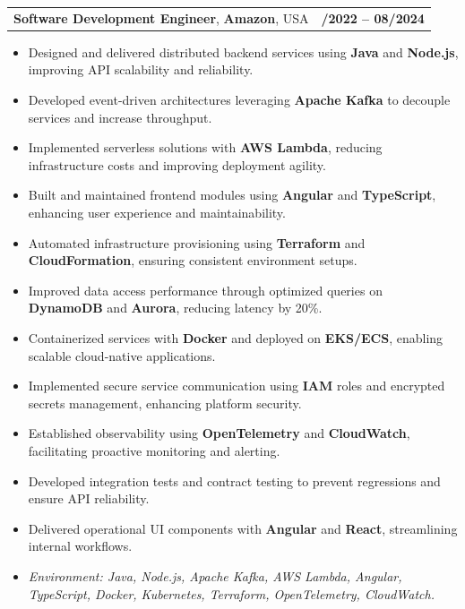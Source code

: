 \documentclass[letterpaper,11pt]{article}
\makeatletter
\newcommand{\resumeItem}[1]{
  \item\footnotesize{
    {#1 \vspace{-2pt}}
  }
}
\newcommand{\resumeSubheading}[4]{
  \vspace{-2pt}\item
    \begin{tabular*}{1.0\textwidth}[t]{l@{\extracolsep{\fill}}r}
      \textbf{\fontsize{10pt}{14pt}\selectfont #3}, \textbf{\fontsize{10pt}{14pt}\selectfont #1}, \fontsize{10pt}{14pt}\selectfont #4 & \textbf{\fontsize{10pt}{14pt}\selectfont #2} \\
    \end{tabular*}\vspace{-7pt}
}
\newcommand{\resumeItemListStart}{\begin{itemize}[leftmargin=*]}
\newcommand{\resumeItemListEnd}{\end{itemize}\vspace{-5pt}}
\makeatother
\begin{document}
\resumeSubheading
{Amazon}{10/2022 -- 08/2024}
{Software Development Engineer}{USA}
\resumeItemListStart
  \resumeItem{Designed and delivered distributed backend services using \textbf{Java} and \textbf{Node.js}, improving API scalability and reliability.}
  \resumeItem{Developed event-driven architectures leveraging \textbf{Apache Kafka} to decouple services and increase throughput.}
  \resumeItem{Implemented serverless solutions with \textbf{AWS Lambda}, reducing infrastructure costs and improving deployment agility.}
  \resumeItem{Built and maintained frontend modules using \textbf{Angular} and \textbf{TypeScript}, enhancing user experience and maintainability.}
  \resumeItem{Automated infrastructure provisioning using \textbf{Terraform} and \textbf{CloudFormation}, ensuring consistent environment setups.}
  \resumeItem{Improved data access performance through optimized queries on \textbf{DynamoDB} and \textbf{Aurora}, reducing latency by 20\%.}
  \resumeItem{Containerized services with \textbf{Docker} and deployed on \textbf{EKS/ECS}, enabling scalable cloud-native applications.}
  \resumeItem{Implemented secure service communication using \textbf{IAM} roles and encrypted secrets management, enhancing platform security.}
  \resumeItem{Established observability using \textbf{OpenTelemetry} and \textbf{CloudWatch}, facilitating proactive monitoring and alerting.}
  \resumeItem{Developed integration tests and contract testing to prevent regressions and ensure API reliability.}
  \resumeItem{Delivered operational UI components with \textbf{Angular} and \textbf{React}, streamlining internal workflows.}
  \resumeItem{\textit{Environment: Java, Node.js, Apache Kafka, AWS Lambda, Angular, TypeScript, Docker, Kubernetes, Terraform, OpenTelemetry, CloudWatch.}}
\resumeItemListEnd
\end{document}

